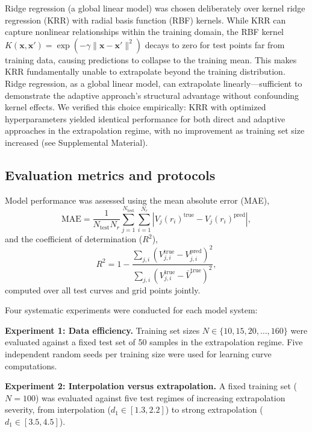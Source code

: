 \documentclass[aps,prb,twocolumn,superscriptaddress,longbibliography,floatfix]{revtex4-2}
\begin{document}
Ridge regression (a global linear model) was chosen deliberately over kernel ridge regression (KRR) with radial basis function (RBF) kernels. While KRR can capture nonlinear relationships within the training domain, the RBF kernel $K(\mathbf{x}, \mathbf{x}') = \exp(-\gamma\|\mathbf{x} - \mathbf{x}'\|^2)$ decays to zero for test points far from training data, causing predictions to collapse to the training mean. This makes KRR fundamentally unable to extrapolate beyond the training distribution. Ridge regression, as a global linear model, can extrapolate linearly---sufficient to demonstrate the adaptive approach's structural advantage without confounding kernel effects. We verified this choice empirically: KRR with optimized hyperparameters yielded identical performance for both direct and adaptive approaches in the extrapolation regime, with no improvement as training set size increased (see Supplemental Material).

\subsection{Evaluation metrics and protocols}
\label{sec:evaluation}

Model performance was assessed using the mean absolute error (MAE),
\begin{equation}
  \mathrm{MAE} = \frac{1}{N_\mathrm{test} N_r} \sum_{j=1}^{N_\mathrm{test}} \sum_{i=1}^{N_r} |V_j(r_i)^\mathrm{true} - V_j(r_i)^\mathrm{pred}|,
\end{equation}
and the coefficient of determination ($R^2$),
\begin{equation}
  R^2 = 1 - \frac{\sum_{j,i}(V_{j,i}^\mathrm{true} - V_{j,i}^\mathrm{pred})^2}{\sum_{j,i}(V_{j,i}^\mathrm{true} - \bar{V}^\mathrm{true})^2},
\end{equation}
computed over all test curves and grid points jointly.

Four systematic experiments were conducted for each model system:

\textbf{Experiment 1: Data efficiency.} Training set sizes $N \in \{10, 15, 20, \ldots, 160\}$ were evaluated against a fixed test set of 50 samples in the extrapolation regime. Five independent random seeds per training size were used for learning curve computations.

\textbf{Experiment 2: Interpolation versus extrapolation.} A fixed training set ($N = 100$) was evaluated against five test regimes of increasing extrapolation severity, from interpolation ($d_1 \in [1.3, 2.2]$) to strong extrapolation ($d_1 \in [3.5, 4.5]$).
\end{document}
